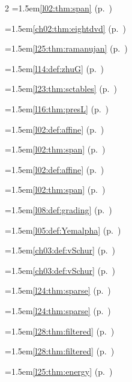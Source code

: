 \begin{multicols}{2}
\hangindent=1.5em\quad \ref{l02:thm:span} (p.~\pageref{l02:thm:span})\par
\hangindent=1.5em\quad \ref{ch02:thm:eightdvd} (p.~\pageref{ch02:thm:eightdvd})\par
\hangindent=1.5em\quad \ref{l25:thm:ramanujan} (p.~\pageref{l25:thm:ramanujan})\par
\hangindent=1.5em\quad \ref{l14:def:zhuG} (p.~\pageref{l14:def:zhuG})\par
\hangindent=1.5em\quad \ref{l23:thm:sctables} (p.~\pageref{l23:thm:sctables})\par
\hangindent=1.5em\quad \ref{l16:thm:presL} (p.~\pageref{l16:thm:presL})\par
\hangindent=1.5em\quad \ref{l02:def:affine} (p.~\pageref{l02:def:affine})\par
\hangindent=1.5em\quad \ref{l02:thm:span} (p.~\pageref{l02:thm:span})\par
\hangindent=1.5em\quad \ref{l02:def:affine} (p.~\pageref{l02:def:affine})\par
\hangindent=1.5em\quad \ref{l02:thm:span} (p.~\pageref{l02:thm:span})\par
\hangindent=1.5em\quad \ref{l08:def:grading} (p.~\pageref{l08:def:grading})\par
\hangindent=1.5em\quad \ref{l05:def:Yemalpha} (p.~\pageref{l05:def:Yemalpha})\par
\hangindent=1.5em\quad \ref{ch03:def:vSchur} (p.~\pageref{ch03:def:vSchur})\par
\hangindent=1.5em\quad \ref{ch03:def:vSchur} (p.~\pageref{ch03:def:vSchur})\par
\hangindent=1.5em\quad \ref{l24:thm:sparse} (p.~\pageref{l24:thm:sparse})\par
\hangindent=1.5em\quad \ref{l24:thm:sparse} (p.~\pageref{l24:thm:sparse})\par
\hangindent=1.5em\quad \ref{l28:thm:filtered} (p.~\pageref{l28:thm:filtered})\par
\hangindent=1.5em\quad \ref{l28:thm:filtered} (p.~\pageref{l28:thm:filtered})\par
\hangindent=1.5em\quad \ref{l25:thm:energy} (p.~\pageref{l25:thm:energy})\par

\end{multicols}
